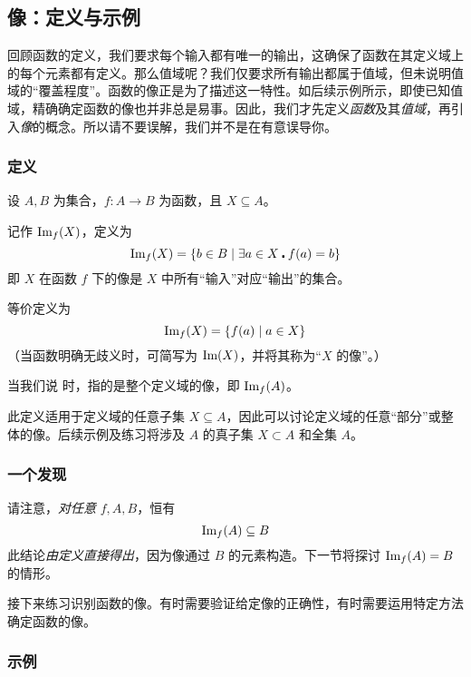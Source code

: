 
\subsection{像：定义与示例}

回顾函数的定义，我们要求每个输入都有唯一的输出，这确保了函数在其定义域上的每个元素都有定义。那么值域呢？我们仅要求所有输出都属于值域，但未说明值域的``覆盖程度''。函数的像正是为了描述这一特性。如后续示例所示，即使已知值域，精确确定函数的像也并非总是易事。因此，我们才先定义\emph{函数}及其\emph{值域}，再引入\emph{像}的概念。所以请不要误解，我们并不是在有意误导你。

\subsubsection*{定义}

\begin{definition}
    设 $A, B$ 为集合，$f:A \to B$ 为函数，且 $X \subseteq A$。

     记作 $\text{Im}_f(X)$，定义为
    \[\text{Im}_f(X) = \{b \in B \mid \exists a \in X \centerdot f(a) = b\}\]
    即 $X$ 在函数 $f$ 下的像是 $X$ 中所有``输入''对应``输出''的集合。

    等价定义为
    \[\text{Im}_f(X) = \{f(a) \mid a \in X\}\]
    （当函数明确无歧义时，可简写为 $\text{Im}(X)$，并将其称为``$X$ 的像''。）

    当我们说 时，指的是整个定义域的像，即 $\text{Im}_f (A)$。
\end{definition}

此定义适用于定义域的任意子集 $X \subseteq A$，因此可以讨论定义域的任意``部分''或整体的像。后续示例及练习将涉及 $A$ 的真子集 $X \subset A$ 和全集 $A$。

\subsubsection*{一个发现}

请注意，\emph{对任意} $f, A, B$，恒有
\[\text{Im}_f(A) \subseteq B\]
此结论\emph{由定义直接得出}，因为像通过 $B$ 的元素构造。下一节将探讨 $\text{Im}_f(A) = B$ 的情形。

接下来练习识别函数的像。有时需要验证给定像的正确性，有时需要运用特定方法确定函数的像。

\subsubsection*{示例}


